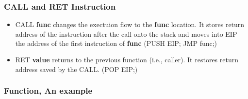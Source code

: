 \documentclass[]{beamer}
\begin{document}
\begin{frame}
  \frametitle{CALL and RET Instruction}
  \begin{itemize}
  \item{CALL {\bf func} changes the exectuion flow to the {\bf func} location. It stores return address of the instruction after the call onto the stack and moves into EIP the address of the first instruction of {\bf func}} (PUSH EIP; JMP func;)
  \item{RET {\bf value} returns to the previous function (i.e., caller). It restores return address saved by the CALL.} (POP EIP;)
  \end{itemize}
\end{frame}

\begin{frame}
  \frametitle{Function, An example}
  \begin{figure}
  \end{figure}
\end{frame}
\end{document}
